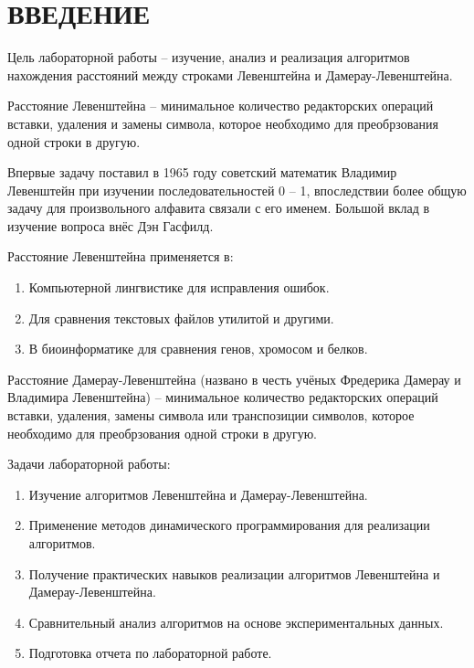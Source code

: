 \chapter*{ВВЕДЕНИЕ}

Цель лабораторной работы -- изучение, анализ и реализация алгоритмов нахождения расстояний между строками Левенштейна и Дамерау-Левенштейна.

Расстояние Левенштейна -- минимальное количество редакторских операций вставки, удаления и замены символа, которое необходимо для преобрзования одной строки в другую. 

Впервые задачу поставил в 1965 году советский математик Владимир Левенштейн \cite{Levenshtein} при изучении последовательностей 0 -- 1, впоследствии более общую задачу для произвольного алфавита связали с его именем. Большой вклад в изучение вопроса внёс Дэн Гасфилд.

Расстояние Левенштейна применяется в: 
\begin{enumerate}[label={\arabic*.}]
	\item Компьютерной лингвистике для исправления ошибок.
	\item Для сравнения текстовых файлов утилитой  и  другими.
	\item В биоинформатике для сравнения генов, хромосом и белков.
\end{enumerate}

Расстояние Дамерау-Левенштейна (названо в честь учёных Фредерика Дамерау и Владимира Левенштейна) -- минимальное количество редакторских операций вставки, удаления, замены символа или транспозиции символов, которое необходимо для преобрзования одной строки в другую.

Задачи лабораторной работы:

\begin{enumerate}[label=\arabic*.]
	\item Изучение алгоритмов Левенштейна и Дамерау-Левенштейна.
	\item Применение методов динамического программирования для реализации алгоритмов.
	\item Получение практических навыков реализации алгоритмов Левенштейна и Дамерау-Левенштейна.
	\item Сравнительный анализ алгоритмов на основе экспериментальных данных.
	\item Подготовка отчета по лабораторной работе.
\end{enumerate}

\pagebreak

